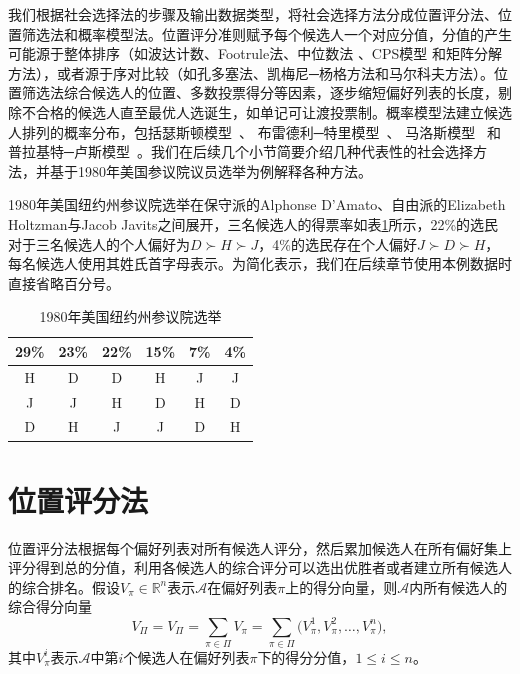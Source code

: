 我们根据社会选择法的步骤及输出数据类型\cite{riker1982liberalism,farah2007outranking}，将社会选择方法分成位置评分法、位置筛选法和概率模型法。位置评分准则赋予每个候选人一个对应分值，分值的产生可能源于整体排序（如波达计数\cite{borda1781m}、Footrule法\cite{marden1995analyzing}、中位数法
\cite{fagin2003efficient}、CPS模型\cite{qin2010new} 和矩阵分解方法\cite{gleich2011rank}），或者源于序对比较（如孔多塞法、凯梅尼─杨格方法和马尔科夫方法）。位置筛选法综合候选人的位置、多数投票得分等因素，逐步缩短偏好列表的长度，剔除不合格的候选人直至最优人选诞生，如单记可让渡投票制。概率模型法建立候选人排列的概率分布，包括瑟斯顿模型~\cite{thurstone1927method}、 布雷德利─特里模型~\cite{bradley1952rank}、 马洛斯模型~\cite{mallows1957non} 和普拉基特─卢斯模型~\cite{luce1959individual,plackett1975analysis}。我们在后续几个小节简要介绍几种代表性的社会选择方法，并基于1980年美国参议院议员选举为例解释各种方法。

\begin{example}\cite{taylor2008mathematics}
1980年美国纽约州参议院选举在保守派的Alphonse D'Amato、自由派的Elizabeth Holtzman与Jacob Javits之间展开，三名候选人的得票率如表\ref{tbl:1980ussenate}所示，22\%的选民对于三名候选人的个人偏好为$D\succ H\succ J$，4\%的选民存在个人偏好$J\succ D\succ H$，每名候选人使用其姓氏首字母表示。为简化表示，我们在后续章节使用本例数据时直接省略百分号。
\begin{table}[ht]
    \centering
    \begin{tabular}{c|c|c|c|c|c}
      \hline
      29\% & 23\% & 22\% & 15\% & 7\% & 4\%\\
      \hline
      H & D & D & H & J & J\\
      J & J & H & D & H & D\\
      D & H & J & J & D & H\\
      \hline
    \end{tabular}
    \caption{1980年美国纽约州参议院选举}
    \label{tbl:1980ussenate}
\end{table}
\end{example}\label{eg:1980usny}

\section{位置评分法}
位置评分法根据每个偏好列表对所有候选人评分，然后累加候选人在所有偏好集上评分得到总的分值，利用各候选人的综合评分可以选出优胜者或者建立所有候选人的综合排名。假设$V_\pi\in \mathbb R^n$表示$\mathcal A$在偏好列表$\pi$上的得分向量，则$\mathcal A$内所有候选人的综合得分向量
\begin{equation}
    V_\Pi=V_\Pi = \sum\limits_{\pi\in \Pi}V_\pi = \sum\limits_{\pi\in \Pi} \bigg(V_\pi^1,V_\pi^2, \ldots, V_\pi^n\bigg),
\end{equation}
其中$V_\pi^i$表示$\mathcal A$中第$i$个候选人在偏好列表$\pi$下的得分分值，$1\le i\le n$。


